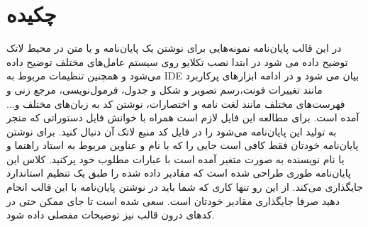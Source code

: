 \fancyhf{}
\chapter*{\vfill چکیده}
{\fontsize{10}{11}\selectfont
در این قالب پایان‌نامه نمونه‌هایی برای نوشتن یک پایان‌نامه و یا متن در محیط لاتک توضیح داده می شود در ابتدا نصب تکلایو روی سیستم عامل‌های مختلف توضیح داده می‌شود و همچنین تنظیمات مربوط به IDE بیان می شود و در ادامه ابزار‌های پرکاربرد مانند تغییرات فونت،رسم تصویر و شکل و جدول، فرمول‌نویسی، مرجع زنی و فهرست‌های مختلف مانند لغت نامه و اختصارات، نوشتن کد به زبان‌های مختلف و... آمده است. برای مطالعه این فایل لازم است همراه با خوانش فایل  دستوراتی که منجر به تولید این پایان‌نامه می‌شود  را در فایل کد منبع لاتک آن دنبال کنید. برای نوشتن پایان‌نامه خودتان فقط کافی است جایی را که با نام و عناوین مربوط به استاد راهنما و یا نام نویسنده به صورت متغیر آمده است با عبارات مطلوب خود پرکنید. کلاس این پایان‌نامه طوری طراحی شده است که مقادیر داده شده را طبق یک تنظیم استاندارد جایگذاری می‌کند. از این رو تنها کاری که شما باید در نوشتن پایان‌نامه با این قالب انجام دهید صرفا جایگذاری مقادیر خودتان است. سعی شده است تا جای ممکن حتی در کدهای درون قالب نیز توضیحات مفصلی داده شود.

}
 \newpage
